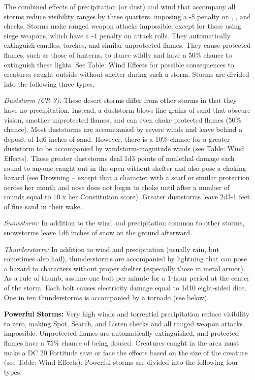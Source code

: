 The combined effects of precipitation (or dust) and wind that accompany all storms 
reduce visibility ranges by three quarters, imposing a -8 penalty on , , 
and  checks. Storms make ranged weapon attacks impossible, except for those 
using siege weapons, which have a -4 penalty on attack rolls. They automatically 
extinguish candles, torches, and similar unprotected flames. They cause protected 
flames, such as those of lanterns, to dance wildly and have a 50\% chance to extinguish 
these lights. See Table: Wind Effects for possible consequences to creatures caught 
outside without shelter during such a storm. Storms are divided into the following 
three types. 

\textit{Duststorm (CR 3):} These desert storms differ from other storms in that 
they have no precipitation. Instead, a duststorm blows fine grains of sand that 
obscure vision, smother unprotected flames, and can even choke protected flames 
(50\% chance). Most duststorms are accompanied by severe winds and leave behind 
a deposit of 1d6 inches of sand. However, there is a 10\% chance for a greater 
duststorm to be accompanied by windstorm-magnitude winds (see Table: Wind Effects). 
These greater duststorms deal 1d3 points of nonlethal damage each round to anyone 
caught out in the open without shelter and also pose a choking hazard (see Drowning -- except 
that a character with a scarf or similar protection across her mouth and nose does 
not begin to choke until after a number of rounds equal to 10 x 
her Constitution score). Greater duststorms leave 2d3-1 feet of fine sand in their 
wake.

\textit{Snowstorm:} In addition to the wind and precipitation common to other storms, 
snowstorms leave 1d6 inches of snow on the ground afterward. 

\textit{Thunderstorm:} In addition to wind and precipitation (usually rain, but 
sometimes also hail), thunderstorms are accompanied by lightning that can pose 
a hazard to characters without proper shelter (especially those in metal armor). 
As a rule of thumb, assume one bolt per minute for a 1-hour period at the center 
of the storm. Each bolt causes electricity damage equal to 1d10 eight-sided dice. 
One in ten thunderstorms is accompanied by a tornado (see below). 

\textbf{Powerful Storms:} Very high winds and torrential precipitation reduce visibility 
to zero, making Spot, Search, and Listen checks and all ranged weapon attacks impossible. 
Unprotected flames are automatically extinguished, and protected flames have a 
75\% chance of being doused. Creatures caught in the area must make a DC 20 Fortitude 
save or face the effects based on the size of the creature (see Table: Wind Effects). 
Powerful storms are divided into the following four types.

